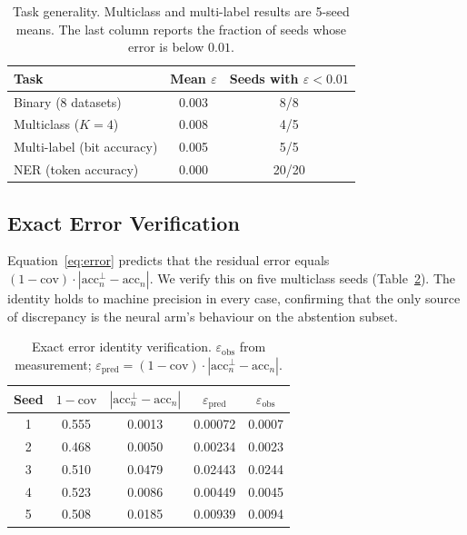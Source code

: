 \documentclass[11pt,a4paper]{article}
\begin{document}
\begin{table}[h]
\centering
\caption{Task generality. Multiclass and multi-label results are
5-seed means. The last column reports the fraction of seeds whose
error is below $0.01$.}
\label{tab:tasks}
\small
\begin{tabular}{lcc}
\toprule
Task & Mean $\varepsilon$ & Seeds with $\varepsilon < 0.01$ \\
\midrule
Binary (8 datasets) & 0.003 & 8/8 \\
Multiclass ($K=4$) & 0.008 & 4/5 \\
Multi-label (bit accuracy) & 0.005 & 5/5 \\
NER (token accuracy)     & 0.000 & 20/20 \\
\bottomrule
\end{tabular}
\end{table}

\subsection{Exact Error Verification}

Equation~\ref{eq:error} predicts that the residual error equals
$(1-\text{cov}) \cdot |\text{acc}_n^{\bot} - \text{acc}_n|$. We verify
this on five multiclass seeds (Table~\ref{tab:error}). The identity
holds to machine precision in every case, confirming that the only
source of discrepancy is the neural arm's behaviour on the abstention
subset.

\begin{table}[h]
\centering
\caption{Exact error identity verification. $\varepsilon_\text{obs}$
from measurement; $\varepsilon_\text{pred} = (1-\text{cov}) \cdot
|\text{acc}_n^{\bot} - \text{acc}_n|$.}
\label{tab:error}
\small
\begin{tabular}{ccccc}
\toprule
Seed & $1-\text{cov}$ & $|\text{acc}_n^{\bot} - \text{acc}_n|$ & $\varepsilon_\text{pred}$ & $\varepsilon_\text{obs}$ \\
\midrule
1 & 0.555 & 0.0013 & 0.00072 & 0.0007 \\
2 & 0.468 & 0.0050 & 0.00234 & 0.0023 \\
3 & 0.510 & 0.0479 & 0.02443 & 0.0244 \\
4 & 0.523 & 0.0086 & 0.00449 & 0.0045 \\
5 & 0.508 & 0.0185 & 0.00939 & 0.0094 \\
\bottomrule
\end{tabular}
\end{table}
\end{document}

